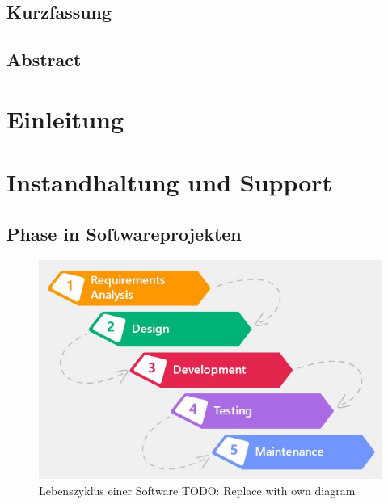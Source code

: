 \documentclass[oneside, ngerman, final, 11pt, a4paper, 1.1headlines, headinclude=false, footinclude=false, mpinclude=false, pagesize, onecolumn, titlepage, parskip=half, headsepline, chapterprefix=false, version=first, listof=totoc, bibliography=totoc, toc=graduated, fleqn, twoside=true]{scrbook}
\begin{document}
	\newpage{}
	
	\section*{\thispagestyle{empty}Kurzfassung}
	
	\textit{\lipsum[1-4]}
	
	\newpage{}
	
	\section*{\thispagestyle{empty}Abstract}
	
	\textit{\lipsum[1-4]}
	
	\newpage{}
	
	\setcounter{page}{1}
	
	\tableofcontents{}
	
	\newpage{}
	
	\setcounter{page}{1} 
	
	\chapter{Einleitung}
	
	
	\chapter{Instandhaltung und Support}
	
		\section{Phase in Softwareprojekten}

			\begin{figure}
				\centering
				\vspace{-\baselineskip}
				\includegraphics[width=\linewidth]{img/software-development-life-cycle.jpg}
				\caption{Lebenszyklus einer Software {\color{red}TODO: Replace with own diagram}}
				\label{fig:software-development-life-cycle}
			\end{figure}
			
\end{document}
